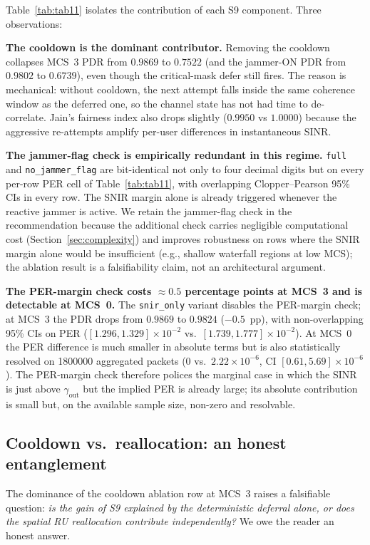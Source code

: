 \documentclass[journal,onecolumn,11pt,a4paper]{IEEEtran}
\newcommand{\gout}{\gamma_{\mathrm{out}}}
\begin{document}
Table~\ref{tab:tab11} isolates the contribution of each S9 component.
Three observations:

\textbf{The cooldown is the dominant contributor.} Removing the
cooldown collapses MCS~3 PDR from $0.9869$ to $\mathbf{0.7522}$ (and
the jammer-ON PDR from $0.9802$ to $\mathbf{0.6739}$), even though the
critical-mask defer still fires. The reason is mechanical: without
cooldown, the next attempt falls inside the same coherence window as
the deferred one, so the channel state has not had time to
de-correlate. Jain's fairness index also drops slightly ($0.9950$ vs
$1.0000$) because the aggressive re-attempts amplify per-user
differences in instantaneous SINR.

\textbf{The jammer-flag check is empirically redundant in this
regime.} \texttt{full} and \texttt{no\_jammer\_flag} are
bit-identical not only to four decimal digits but on every per-row
PER cell of Table~\ref{tab:tab11}, with overlapping
Clopper--Pearson 95\% CIs in every row. The SNIR margin alone is
already triggered whenever the reactive jammer is active. We retain
the jammer-flag check in the recommendation because the additional
check carries negligible computational cost
(Section~\ref{sec:complexity}) and improves robustness on rows where
the SNIR margin alone would be insufficient (e.g., shallow waterfall
regions at low MCS); the ablation result is a falsifiability claim,
not an architectural argument.

\textbf{The PER-margin check costs $\approx 0.5$ percentage points
at MCS~3 and is detectable at MCS~0.} The \texttt{snir\_only}
variant disables the PER-margin check; at MCS~3 the PDR drops from
$0.9869$ to $0.9824$ ($-0.5$~pp), with non-overlapping 95\% CIs on
PER ($[1.296,1.329]\times 10^{-2}$ vs.\
$[1.739,1.777]\times 10^{-2}$). At MCS~0 the PER difference is much
smaller in absolute terms but is also statistically resolved on
\num{1800000} aggregated packets ($0$ vs.\
$2.22\times 10^{-6}$, CI $[0.61,5.69]\times 10^{-6}$). The
PER-margin check therefore polices the marginal case in which the
SINR is just above $\gout$ but the implied PER is already large; its
absolute contribution is small but, on the available sample size,
non-zero and resolvable.

\subsection{Cooldown vs.\ reallocation: an honest entanglement}
\label{sec:cooldown-vs-realloc}

The dominance of the cooldown ablation row at MCS~3 raises a
falsifiable question: \emph{is the gain of S9 explained by the
deterministic deferral alone, or does the spatial RU reallocation
contribute independently?} We owe the reader an honest answer.
\end{document}

